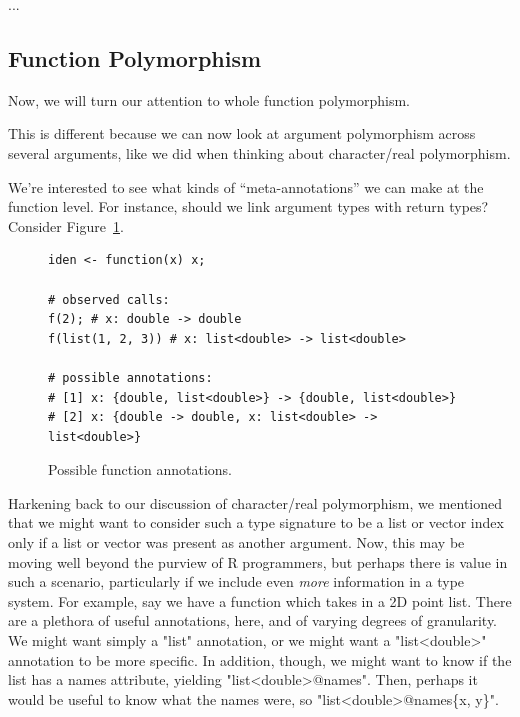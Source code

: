 \documentclass[acmsmall,10pt,review,anonymous]{acmart}\settopmatter{printfolios=true,printccs=false,printacmref=false}
\begin{document}
...

%
%
%
%
\subsection{Function Polymorphism}

Now, we will turn our attention to whole function polymorphism.

This is different because we can now look at argument polymorphism across several arguments, like we did when thinking about character/real polymorphism.

We're interested to see what kinds of ``meta-annotations'' we can make at the function level.
For instance, should we link argument types with return types?
Consider Figure~\ref{fig:funanno}.
\begin{figure}[!hb]{\small\begin{lstlisting}[style=R]
iden <- function(x) x;

# observed calls:
f(2); # x: double -> double
f(list(1, 2, 3)) # x: list<double> -> list<double>

# possible annotations:
# [1] x: {double, list<double>} -> {double, list<double>}
# [2] x: {double -> double, x: list<double> -> list<double>}
\end{lstlisting}}\caption{Possible function annotations.}\label{fig:funanno}\end{figure}

Harkening back to our discussion of character/real polymorphism, we mentioned that we might want to consider such a type signature to be a list or vector index only if a list or vector was present as another argument.
Now, this may be moving well beyond the purview of R programmers, but perhaps there is value in such a scenario, particularly if we include even {\it more} information in a type system.
For example, say we have a function which takes in a 2D point list.
There are a plethora of useful annotations, here, and of varying degrees of granularity.
We might want simply a "list" annotation, or we might want a "list<double>" annotation to be more specific.
In addition, though, we might want to know if the list has a names attribute, yielding "list<double>@names".
Then, perhaps it would be useful to know what the names were, so "list<double>@names\{x, y\}".
\end{document}

